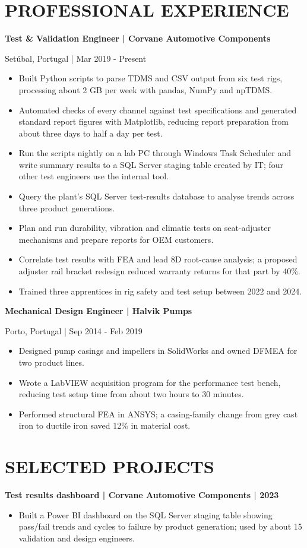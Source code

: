 \documentclass[11pt,a4paper]{article}
\newcommand{\cvsection}[1]{\section*{#1}}
\begin{document}
\cvsection{PROFESSIONAL EXPERIENCE}
\textbf{Test \& Validation Engineer | Corvane Automotive Components}\par
Setúbal, Portugal | Mar 2019 - Present
\begin{itemize}
\item Built Python scripts to parse TDMS and CSV output from six test rigs, processing about 2 GB per week with pandas, NumPy and npTDMS.
\item Automated checks of every channel against test specifications and generated standard report figures with Matplotlib, reducing report preparation from about three days to half a day per test.
\item Run the scripts nightly on a lab PC through Windows Task Scheduler and write summary results to a SQL Server staging table created by IT; four other test engineers use the internal tool.
\item Query the plant's SQL Server test-results database to analyse trends across three product generations.
\item Plan and run durability, vibration and climatic tests on seat-adjuster mechanisms and prepare reports for OEM customers.
\item Correlate test results with FEA and lead 8D root-cause analysis; a proposed adjuster rail bracket redesign reduced warranty returns for that part by 40\%.
\item Trained three apprentices in rig safety and test setup between 2022 and 2024.
\end{itemize}

\textbf{Mechanical Design Engineer | Halvik Pumps}\par
Porto, Portugal | Sep 2014 - Feb 2019
\begin{itemize}
\item Designed pump casings and impellers in SolidWorks and owned DFMEA for two product lines.
\item Wrote a LabVIEW acquisition program for the performance test bench, reducing test setup time from about two hours to 30 minutes.
\item Performed structural FEA in ANSYS; a casing-family change from grey cast iron to ductile iron saved 12\% in material cost.
\end{itemize}

\newpage
\cvsection{SELECTED PROJECTS}
\textbf{Test results dashboard | Corvane Automotive Components | 2023}
\begin{itemize}
\item Built a Power BI dashboard on the SQL Server staging table showing pass/fail trends and cycles to failure by product generation; used by about 15 validation and design engineers.
\end{itemize}
\end{document}

